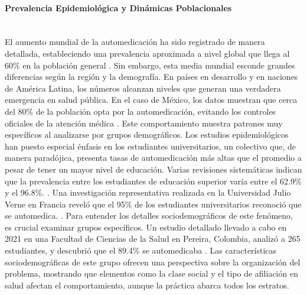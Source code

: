 \paragraph{Prevalencia Epidemiológica y Dinámicas Poblacionales}\leavevmode \\

El aumento mundial de la automedicación ha sido registrado de manera detallada, estableciendo una prevalencia aproximada a nivel global que llega al 60\% en la población general \cite{pacha2023automedicacion}. Sin embargo, esta media mundial esconde grandes diferencias según la región y la demografía. En países en desarrollo y en naciones de América Latina, los números alcanzan niveles que generan una verdadera emergencia en salud pública. En el caso de México, los datos muestran que cerca del 80\% de la población opta por la automedicación, evitando los controles oficiales de la atención médica \cite{alba2020principales}.
Este comportamiento muestra patrones muy específicos al analizarse por grupos demográficos. Los estudios epidemiológicos han puesto especial énfasis en los estudiantes universitarios, un colectivo que, de manera paradójica, presenta tasas de automedicación más altas que el promedio a pesar de tener un mayor nivel de educación. Varias revisiones sistemáticas indican que la prevalencia entre los estudiantes de educación superior varía entre el 62.9\% y el 96.8\%. \cite{ramos2025automedicacion}. Una investigación representativa realizada en la Universidad Julio Verne en Francia reveló que el 95\% de los estudiantes universitarios reconoció que se automedica. \cite{suarez2025prevalencia}.
Para entender los detalles sociodemográficos de este fenómeno, es crucial examinar grupos específicos. Un estudio detallado llevado a cabo en 2021 en una Facultad de Ciencias de la Salud en Pereira, Colombia, analizó a 265 estudiantes, y descubrió que el 89.4\% se automedicaba \cite{suarez2025prevalencia}. Las características sociodemográficas de este grupo ofrecen una perspectiva sobre la organización del problema, mostrando que elementos como la clase social y el tipo de afiliación en salud afectan el comportamiento, aunque la práctica abarca todos los estratos.

